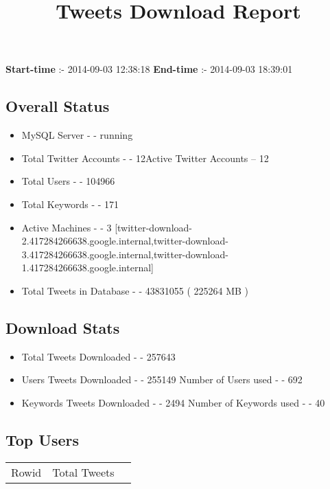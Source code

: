 \documentclass{article}\usepackage[T1]{fontenc}
\begin{document}
\title{\textbf{Tweets Download Report}}
               \date{}
                \maketitle
               \centerline{\textbf{Start-time} :- 2014-09-03 12:38:18 \hspace{40pt} \textbf{End-time} :- 2014-09-03 18:39:01}               \subsection*{Overall Status}                \begin{itemize}                \item MySQL Server - - running               \item Total Twitter Accounts - - 12\newline Active Twitter Accounts -- 12               \item Total Users - - 104966               \item Total Keywords - - 171               \item Active Machines - - 3 [twitter-download-2.417284266638.google.internal,twitter-download-3.417284266638.google.internal,twitter-download-1.417284266638.google.internal]               \item Total Tweets in Database - - 43831055 ( 225264 MB )               \end{itemize}               \subsection*{Download Stats}                \begin{itemize}                \item Total Tweets Downloaded - - 257643               \item Users Tweets Downloaded - - 255149 \newline Number of Users used - - 692               \item Keywords Tweets Downloaded - - 2494 \newline Number of Keywords used - - 40              \end{itemize}              \subsection*{Top Users}\begin{tabular}{|c|c|c|}         \hline         Rowid & Total Tweets \\ 

\end{tabular}
\end{document}
